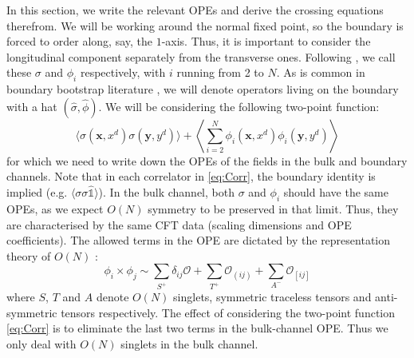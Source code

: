 \documentclass[a4paper,11pt]{article}
\begin{document}
In this section, we write the relevant OPEs and derive the crossing equations therefrom. We will be working around the normal fixed point, so the boundary is forced to order along, say, the $1$-axis. Thus, it is important to consider the longitudinal component separately from the transverse ones. Following \cite{Max}, we call these $\sigma$ and $\phi_i$ respectively, with $i$ running from 2 to $N$. As is common in boundary bootstrap literature \cite{Liendo}\cite{Gliozzi}, we will denote operators living on the boundary with a hat $(\hat{\sigma}, \hat{\phi})$. We will be considering the following two-point function:
\begin{equation}
\label{eq:Corr}
    \langle \sigma(\textbf{x},x^d)\sigma(\textbf{y}, y^d) \rangle + \left\langle \sum_{i = 2}^N \phi_i(\textbf{x}, x^d) \phi_i(\textbf{y}, y^d) \right\rangle
\end{equation} 
for which we need to write down the OPEs of the fields in the bulk and boundary channels. Note that in each correlator in \ref{eq:Corr}, the boundary identity is implied (e.g. $\langle\sigma\sigma\hat{\mathds{1}}\rangle$). In the bulk channel, both $\sigma$ and $\phi_i$ should have the same OPEs, as we expect $O(N)$ symmetry to be preserved in that limit. Thus, they are characterised by the same CFT data (scaling dimensions and OPE coefficients). The allowed terms in the OPE are dictated by the representation theory of $O(N)$ \cite{Kos}:
\begin{equation}
    \phi_i \times \phi_j \sim \sum_{S^+} \delta_{ij}\mathcal{O} + \sum_{T^+}\mathcal{O}_{(ij)} + \sum_{A^-}\mathcal{O}_{[ij]}
\end{equation}
where $S$, $T$ and $A$ denote $O(N)$ singlets, symmetric traceless tensors and anti-symmetric tensors respectively. The effect of considering the two-point function \ref{eq:Corr} is to eliminate the last two terms in the bulk-channel OPE. Thus we only deal with $O(N)$ singlets in the bulk channel. 
\end{document}

